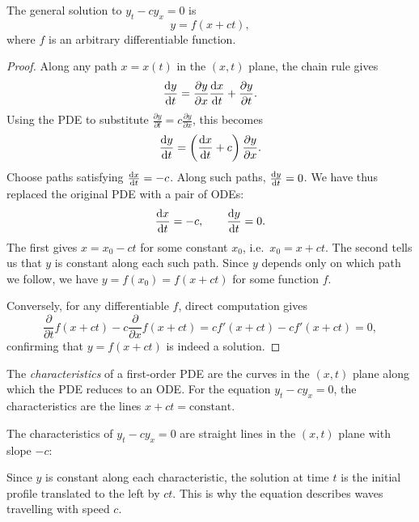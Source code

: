 \documentclass[a4paper]{article}
\begin{document}
\begin{prop}
  The general solution to $y_t - cy_x = 0$ is
  \[
    y = f(x + ct),
  \]
  where $f$ is an arbitrary differentiable function.
\end{prop}

\begin{proof}
  Along any path $x = x(t)$ in the $(x, t)$ plane, the chain rule gives
  \[
    \frac{\mathrm{d} y}{\mathrm{d} t} = \frac{\partial y}{\partial x}\frac{\mathrm{d} x}{\mathrm{d} t} + \frac{\partial y}{\partial t}.
  \]
  Using the PDE to substitute $\frac{\partial y}{\partial t} = c\frac{\partial y}{\partial x}$, this becomes
  \[
    \frac{\mathrm{d} y}{\mathrm{d} t} = \left(\frac{\mathrm{d} x}{\mathrm{d} t} + c\right)\frac{\partial y}{\partial x}.
  \]
  Choose paths satisfying $\frac{\mathrm{d} x}{\mathrm{d} t} = -c$. Along such paths, $\frac{\mathrm{d} y}{\mathrm{d} t} = 0$. We have thus replaced the original PDE with a pair of ODEs:
  \[
    \frac{\mathrm{d} x}{\mathrm{d} t} = -c, \qquad \frac{\mathrm{d} y}{\mathrm{d} t} = 0.
  \]
  The first gives $x = x_0 - ct$ for some constant $x_0$, i.e.\ $x_0 = x + ct$. The second tells us that $y$ is constant along each such path. Since $y$ depends only on which path we follow, we have $y = f(x_0) = f(x + ct)$ for some function $f$.

  Conversely, for any differentiable $f$, direct computation gives
  \[
    \frac{\partial}{\partial t}f(x + ct) - c\frac{\partial}{\partial x}f(x + ct) = cf'(x + ct) - cf'(x + ct) = 0,
  \]
  confirming that $y = f(x + ct)$ is indeed a solution.
\end{proof}

\begin{defi}[Characteristics]
  The \emph{characteristics} of a first-order PDE are the curves in the $(x,t)$ plane along which the PDE reduces to an ODE. For the equation $y_t - cy_x = 0$, the characteristics are the lines $x + ct = \text{constant}$.
\end{defi}

\begin{remark}
  The characteristics of $y_t - cy_x = 0$ are straight lines in the $(x, t)$ plane with slope $-c$:
  \begin{center}
  \end{center}
  Since $y$ is constant along each characteristic, the solution at time $t$ is the initial profile translated to the left by $ct$. This is why the equation describes waves travelling with speed $c$.
\end{remark}
\end{document}
